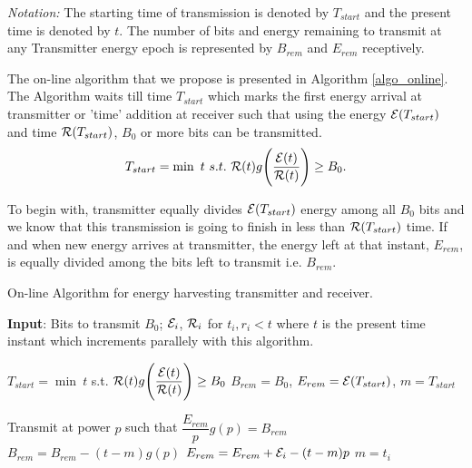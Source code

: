 \textit{Notation:} The starting time of transmission is denoted by $T_{start}$ and the present time is denoted by $t$. The number of bits and energy remaining to transmit at any Transmitter energy epoch is represented by $B_{rem}$ and $E_{rem}$ receptively.

The on-line algorithm that we propose is presented in Algorithm \ref{algo_online}. The Algorithm waits till time $T_{start}$ which marks the first energy arrival at transmitter or 'time' addition at receiver such that using the energy $\mathcal{E}(T_{start})$ and time $\mathcal{R}(T_{start})$, $B_0$ or more bits can be transmitted.
\begin{equation}
T_{start}=\min\ t \ s.t.\  \TRx(t)g\Bigg{(} \dfrac{\ETx(t)}{\TRx(t)}\Bigg{)}\ge B_0.\label{online_T_start}
\end{equation}

To begin with, transmitter equally divides $\mathcal{E}(T_{start})$ energy among all $B_0$ bits and we know that this transmission is going to finish in less than $\mathcal{R}(T_{start})$ time. If and when new energy arrives at transmitter, the energy left at that instant, $E_{rem}$, is equally divided among the bits left to transmit i.e. $B_{rem}$.

\begin{algorithm}
\caption {On-line Algorithm for energy harvesting transmitter and receiver.}
\footnotesize
\label{algo_online}
\begin{algorithmic}[1]
\State \textbf{Input}: Bits to transmit $B_0$; $\mathcal{E}_i$, $\mathcal{R}_i$ for $t_i,r_i<t$ where $t$ is the present time instant which increments parallely with this algorithm. 

\State $T_{start}=\min\ t$ s.t. $\mathcal{R}(t)g\Bigg{(} \dfrac{\mathcal{E}(t)}{\mathcal{R}(t)}\Bigg{)}\ge B_0$
\State $B_{rem}=B_0$, $E_{rem}=\mathcal{E}(T_{start})$, $m=T_{start}$

\Do
	\State Transmit at power $p$ such that $\dfrac{E_{rem}}{p} g(p)= B_{rem}$
		\State $B_{rem}=B_{rem}-(t-m)g(p)$
		\State $E_{rem}=E_{rem}+\mathcal{E}_i-(t-m)p$
		\State $m=t_i$
	\EndIf
{}
\end{algorithmic}
\end{algorithm}

